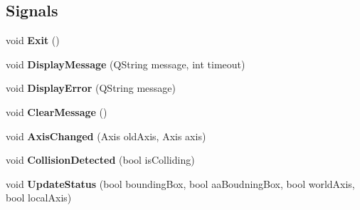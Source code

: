 \subsection*{Signals}
\begin{DoxyCompactItemize}
\item 
\hypertarget{class_home_designer_open_g_l_widget_ae8ccce3d055bc7c0889eea58c32315d8}{}void {\bfseries Exit} ()\label{class_home_designer_open_g_l_widget_ae8ccce3d055bc7c0889eea58c32315d8}

\item 
\hypertarget{class_home_designer_open_g_l_widget_acaf3c61231c51992ddc589ec4f87b080}{}void {\bfseries Display\+Message} (Q\+String message, int timeout)\label{class_home_designer_open_g_l_widget_acaf3c61231c51992ddc589ec4f87b080}

\item 
\hypertarget{class_home_designer_open_g_l_widget_a7da876eafb33c27ee6ea24100924a0ce}{}void {\bfseries Display\+Error} (Q\+String message)\label{class_home_designer_open_g_l_widget_a7da876eafb33c27ee6ea24100924a0ce}

\item 
\hypertarget{class_home_designer_open_g_l_widget_af43c80a3c488bf2a128c443ef7786782}{}void {\bfseries Clear\+Message} ()\label{class_home_designer_open_g_l_widget_af43c80a3c488bf2a128c443ef7786782}

\item 
\hypertarget{class_home_designer_open_g_l_widget_a9794810f40ecfb50cdd5bf4cdcf04cbe}{}void {\bfseries Axis\+Changed} (Axis old\+Axis, Axis axis)\label{class_home_designer_open_g_l_widget_a9794810f40ecfb50cdd5bf4cdcf04cbe}

\item 
\hypertarget{class_home_designer_open_g_l_widget_ab35b87b7e709ee647f6d44311d8942bf}{}void {\bfseries Collision\+Detected} (bool is\+Colliding)\label{class_home_designer_open_g_l_widget_ab35b87b7e709ee647f6d44311d8942bf}

\item 
\hypertarget{class_home_designer_open_g_l_widget_a231dd62d34d46dd13239c1cfa29a4292}{}void {\bfseries Update\+Status} (bool bounding\+Box, bool aa\+Boudning\+Box, bool world\+Axis, bool local\+Axis)\label{class_home_designer_open_g_l_widget_a231dd62d34d46dd13239c1cfa29a4292}

\end{DoxyCompactItemize}
